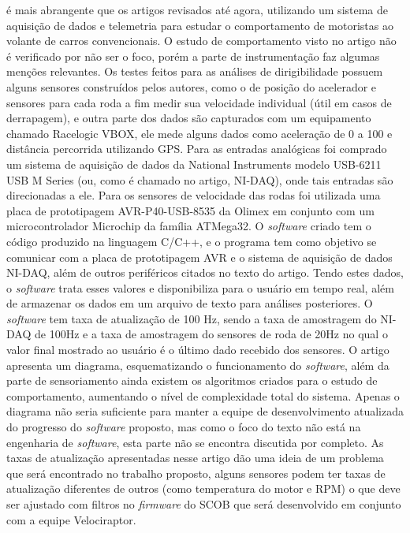  é mais abrangente que os artigos revisados até agora, utilizando um sistema de aquisição de dados e telemetria para estudar o comportamento de motoristas ao volante de carros convencionais. O estudo de comportamento visto no artigo não é verificado por não ser o foco, porém a parte de instrumentação faz algumas menções relevantes. Os testes feitos para as análises de dirigibilidade possuem alguns sensores construídos pelos autores, como o de posição do acelerador e sensores para cada roda a fim medir sua velocidade individual (útil em casos de derrapagem), e outra parte dos dados são capturados com um equipamento chamado Racelogic VBOX, ele mede alguns dados como aceleração de 0 a 100 e distância percorrida utilizando GPS. Para as entradas analógicas foi comprado um sistema de aquisição de dados da National Instruments modelo USB-6211 USB M Series (ou, como é chamado no artigo, NI-DAQ), onde tais entradas são direcionadas a ele. Para os sensores de velocidade das rodas foi utilizada uma placa de prototipagem AVR-P40-USB-8535 da Olimex em conjunto com um microcontrolador Microchip da família ATMega32. O \textit{software} criado tem o código produzido na linguagem C/C++, e o programa tem como objetivo se comunicar com a placa de prototipagem AVR e o sistema de aquisição de dados NI-DAQ, além de outros periféricos citados no texto do artigo. Tendo estes dados, o \textit{software} trata esses valores e disponibiliza para o usuário em tempo real, além de armazenar os dados em um arquivo de texto para análises posteriores. O \textit{software} tem taxa de atualização de 100 Hz, sendo a taxa de amostragem do NI-DAQ de 100Hz e a taxa de amostragem do sensores de roda de 20Hz no qual o valor final mostrado ao usuário é o último dado recebido dos sensores. O artigo apresenta um diagrama, esquematizando o funcionamento do \textit{software}, além da parte de sensoriamento ainda existem os algoritmos criados para o estudo de comportamento, aumentando o nível de complexidade total do sistema\cite{racecarInstrumentationFor2012}. Apenas o diagrama não seria suficiente para manter a equipe de desenvolvimento atualizada do progresso do \textit{software} proposto, mas como o foco do texto não está na engenharia de \textit{software}, esta parte não se encontra discutida por completo. As taxas de atualização apresentadas nesse artigo dão uma ideia de um problema que será encontrado no trabalho proposto, alguns sensores podem ter taxas de atualização diferentes de outros (como temperatura do motor e RPM) o que deve ser ajustado com filtros no \textit{firmware} do SCOB que será desenvolvido em conjunto com a equipe Velociraptor.


